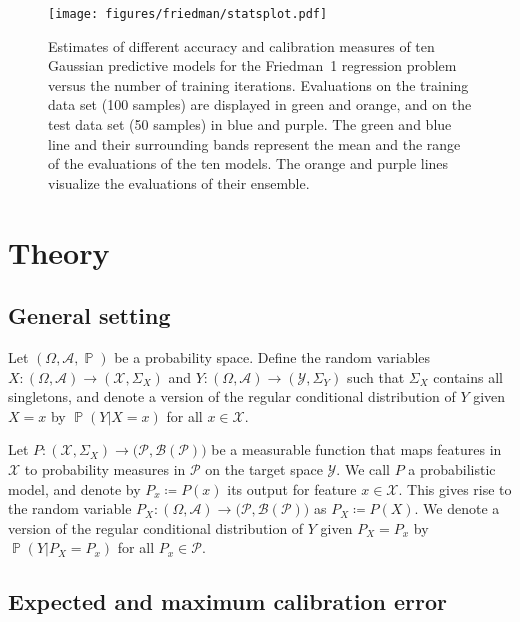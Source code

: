 \documentclass{article}
\DeclareMathOperator{\Prob}{\mathbb{P}}
\begin{document}
\begin{figure}[htp]
    \begin{center}
        \texttt{[image: figures/friedman/statsplot.pdf]}
        \caption{Estimates of different accuracy and calibration measures of ten
        Gaussian predictive models for the Friedman~1 regression problem versus
        the number of training iterations.
        Evaluations on the training data set (100 samples) are displayed in green
        and orange, and on the test data set (50 samples) in blue and purple.
        The green and blue line and their surrounding bands represent
        the mean and the range of the evaluations of the ten models. The orange and
        purple lines visualize the evaluations of their ensemble.}
        \label{fig:friedman1}
    \end{center}
\end{figure}

\section{Theory}
\label{app:theory}

\subsection{General setting}

Let $(\Omega, \mathcal{A}, \Prob)$ be a probability space. Define the random
variables $X \colon (\Omega, \mathcal{A}) \to (\mathcal{X}, \Sigma_X)$
and $Y \colon (\Omega, \mathcal{A}) \to (\mathcal{Y}, \Sigma_Y)$
such that $\Sigma_X$ contains all singletons, and denote a version of the regular
conditional distribution of $Y$ given $X = x$ by $\Prob(Y|X = x)$ for all
$x \in \mathcal{X}$.

Let $P \colon (\mathcal{X}, \Sigma_X) \to \big(\mathcal{P}, \mathcal{B}(\mathcal{P})\big)$
be a measurable function that maps features in $\mathcal{X}$ to
probability measures in $\mathcal{P}$ on the target space $\mathcal{Y}$.
We call $P$ a probabilistic model, and denote by $P_x \coloneqq P(x)$ its
output for feature $x \in \mathcal{X}$. This gives rise to the random
variable $P_X \colon (\Omega, \mathcal{A}) \to \big(\mathcal{P}, \mathcal{B}(\mathcal{P})\big)$
as $P_X \coloneqq P(X)$. We denote a version of the regular conditional distribution
of $Y$ given $P_X = P_x$ by $\Prob(Y| P_X = P_x)$ for all $P_x \in \mathcal{P}$.

\subsection{Expected and maximum calibration error}
\label{app:ece_mce}
\end{document}
